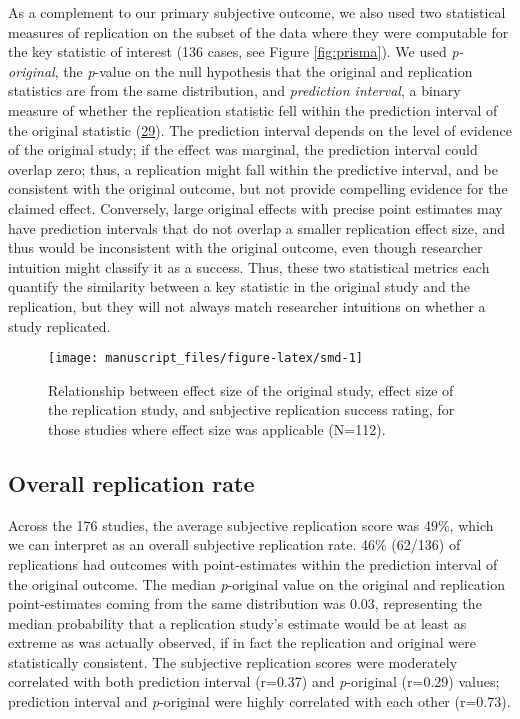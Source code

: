\documentclass[
  english,
  a4paper,
]{article}
\begin{document}
As a complement to our primary subjective outcome, we also used two statistical measures of replication on the subset of the data where they were computable for the key statistic of interest (136 cases, see Figure \ref{fig:prisma}). We used \emph{p-original}, the \emph{p}-value on the null hypothesis that the original and replication statistics are from the same distribution, and \emph{prediction interval}, a binary measure of whether the replication statistic fell within the prediction interval of the original statistic (\protect\hyperlink{ref-mathur2020}{29}). The prediction interval depends on the level of evidence of the original study; if the effect was marginal, the prediction interval could overlap zero; thus, a replication might fall within the predictive interval, and be consistent with the original outcome, but not provide compelling evidence for the claimed effect. Conversely, large original effects with precise point estimates may have prediction intervals that do not overlap a smaller replication effect size, and thus would be inconsistent with the original outcome, even though researcher intuition might classify it as a success. Thus, these two statistical metrics each quantify the similarity between a key statistic in the original study and the replication, but they will not always match researcher intuitions on whether a study replicated.

\begin{figure}[ht]
\texttt{[image: manuscript\_files/figure-latex/smd-1]} \caption{Relationship between effect size of the original study, effect size of the replication study, and subjective replication success rating, for those studies where effect size was applicable (N=112).}\label{fig:smd}
\end{figure}

\hypertarget{overall-replication-rate}{%
\subsection{Overall replication rate}\label{overall-replication-rate}}

Across the 176 studies, the average subjective replication score was 49\%, which we can interpret as an overall subjective replication rate. 46\% (62/136) of replications had outcomes with point-estimates within the prediction interval of the original outcome. The median \emph{p}-original value on the original and replication point-estimates coming from the same distribution was 0.03, representing the median probability that a replication study's estimate would be at least as extreme as was actually observed, if in fact the replication and original were statistically consistent. The subjective replication scores were moderately correlated with both prediction interval (r=0.37) and \emph{p}-original (r=0.29) values; prediction interval and \emph{p}-original were highly correlated with each other (r=0.73).
\end{document}
